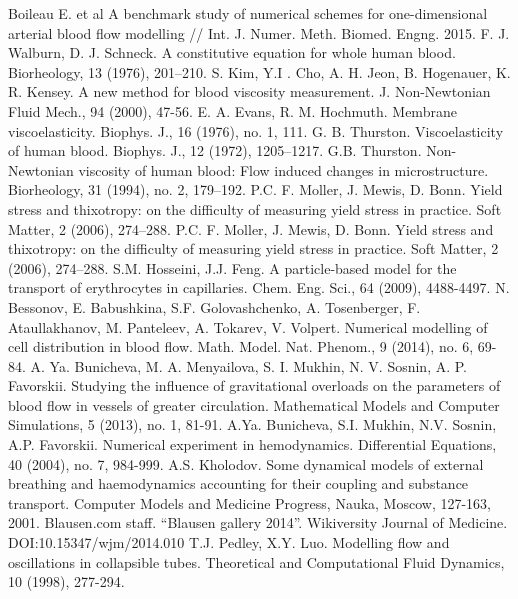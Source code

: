 \begin{thebibliography}{}
      Boileau E. et al A benchmark study of numerical schemes for one-dimensional arterial blood flow modelling // Int. J. Numer. Meth. Biomed. Engng. 2015.
     F. J. Walburn, D. J. Schneck. A constitutive equation for whole human blood. Biorheology, 13 (1976), 201–210.
     S. Kim, Y.I . Cho, A. H. Jeon, B. Hogenauer, K. R. Kensey. A new method for blood viscosity measurement. J. Non-Newtonian Fluid Mech., 94 (2000), 47-56.
      E. A. Evans, R. M. Hochmuth. Membrane viscoelasticity. Biophys. J., 16 (1976), no. 1, 111.
     G. B. Thurston. Viscoelasticity of human blood. Biophys. J., 12 (1972), 1205–1217.
     G.B. Thurston. Non-Newtonian viscosity of human blood: Flow induced changes in microstructure. Biorheology, 31 (1994), no. 2, 179–192.
     P.C. F. Moller, J. Mewis, D. Bonn. Yield stress and thixotropy: on the difficulty of measuring yield stress in practice. Soft Matter, 2 (2006), 274–288.
      P.C. F. Moller, J. Mewis, D. Bonn. Yield stress and thixotropy: on the difficulty of measuring yield stress in practice. Soft Matter, 2 (2006), 274–288.
      S.M. Hosseini, J.J. Feng. A particle-based model for the transport of erythrocytes in capillaries. Chem. Eng. Sci., 64 (2009), 4488-4497.
     N. Bessonov, E. Babushkina, S.F. Golovashchenko, A. Tosenberger, F. Ataullakhanov, M. Panteleev, A. Tokarev, V. Volpert. Numerical modelling of cell distribution in blood flow. Math. Model. Nat. Phenom., 9 (2014), no. 6, 69-84.
     A. Ya. Bunicheva, M. A. Menyailova, S. I. Mukhin, N. V. Sosnin, A. P. Favorskii. Studying the influence of gravitational overloads on the parameters of blood flow in vessels of greater circulation. Mathematical Models and Computer Simulations, 5 (2013), no. 1, 81-91.
     A.Ya. Bunicheva, S.I. Mukhin, N.V. Sosnin, A.P. Favorskii. Numerical experiment in hemodynamics. Differential Equations, 40 (2004), no. 7, 984-999.
     A.S. Kholodov. Some dynamical models of external breathing and haemodynamics accounting for their coupling and substance transport. Computer Models and Medicine Progress, Nauka, Moscow, 127-163, 2001.
     Blausen.com staff. “Blausen gallery 2014”. Wikiversity Journal of Medicine. DOI:10.15347/wjm/2014.010
     T.J. Pedley, X.Y. Luo. Modelling flow and oscillations in collapsible tubes. Theoretical and Computational Fluid Dynamics, 10 (1998), 277-294.

\end{thebibliography}
